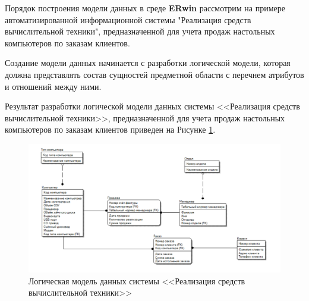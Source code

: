 \documentclass[a4paper,14pt]{extarticle}
\begin{document}
Порядок построения модели данных в среде \textbf{ERwin} рассмотрим на примере
автоматизированной информационной системы "Реализация средств вычислительной
техники", предназначенной для учета продаж настольных компьютеров по заказам
клиентов.

Создание модели данных начинается с разработки логической модели, которая
должна представлять состав сущностей предметной области с перечнем атрибутов и
отношений между ними.

%
%
%
%

Результат разработки логической модели данных системы <<Реализация средств
вычислительной техники>>, предназначенной для учета продаж настольных
компьютеров по заказам клиентов приведен на Рисунке \ref{fig:2-logical-model-method}.

\begin{figure}[htpb]
	\centering
	\includegraphics[width=0.7\linewidth]{images/2-method}
	\caption{Логическая модель данных системы <<Реализация средств вычислительной техники>>}
	\label{fig:2-logical-model-method}
\end{figure}
\end{document}
